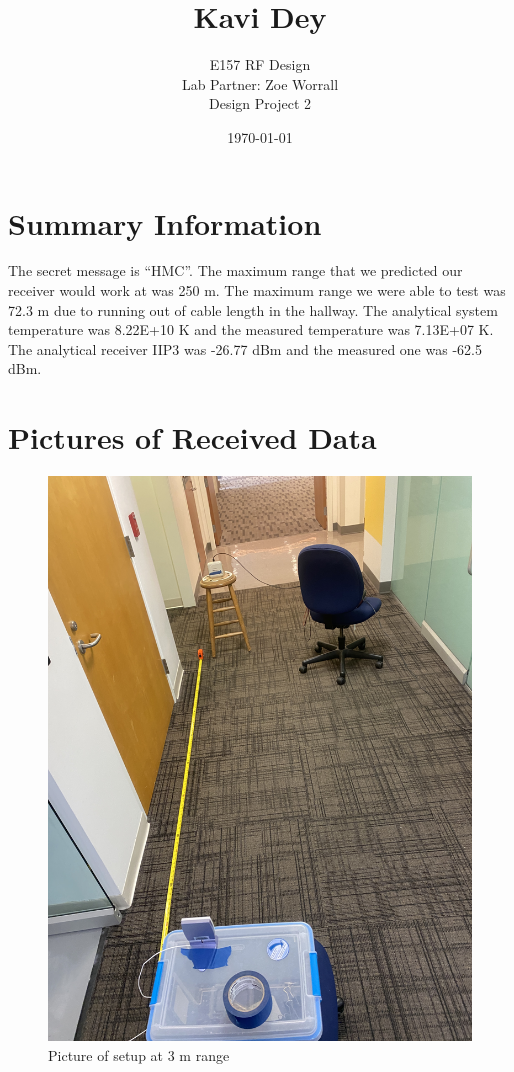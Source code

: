 \documentclass[letterpaper,12pt]{article}
\begin{document}
\title{\vspace{-2cm} Kavi Dey}
\author{\vspace{-0.4cm} E157 RF Design \\ Lab Partner: Zoe Worrall \\ Design Project 2}
\date{\vspace{-0.4cm} \today}
\maketitle



\section{Summary Information}
The secret message is ``HMC''. The maximum range that we predicted our receiver would work at was 250 m.
The maximum range we were able to test was 72.3 m due to running out of cable length in the hallway.
The analytical system temperature was 8.22E+10 K and the measured temperature was 7.13E+07 K.
The analytical receiver IIP3 was -26.77 dBm and the measured one was -62.5 dBm.

\newpage
\section{Pictures of Received Data}
\begin{figure}[H]
	\begin{centering}
		\includegraphics[width=0.5\columnwidth,angle=-90]{figures/3m.img}
		\caption{Picture of setup at 3 m range}
	\end{centering}
\end{figure}
\end{document}
